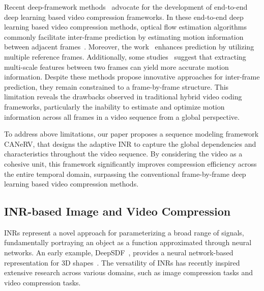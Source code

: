 Recent deep-framework methods~\cite{DBLP:conf/eccv/WuSK18,DBLP:conf/iccv/DjelouahCSS19,DBLP:conf/sips/PessoaATF20,DBLP:conf/dcc/CuiZZJZWZ17,DBLP:journals/tcsv/YanLLLLW19,DBLP:conf/cvpr/LuO0ZCG19,DBLP:conf/cvpr/Lin0L020,DBLP:conf/cvpr/HuL021,li2021deep,ho2022canf,DBLP:journals/tmm/ShengLLLLL23,DBLP:conf/cvpr/LiLL23,Li_2024_CVPR} advocate for the development of end-to-end deep learning based video compression frameworks. In these end-to-end deep learning based video compression methods, optical flow estimation algorithms commonly facilitate inter-frame prediction by estimating motion information between adjacent frames~\cite{DBLP:conf/cvpr/LuO0ZCG19,DBLP:conf/cvpr/HuL021,li2021deep}. Moreover, the work~\cite{DBLP:conf/cvpr/Lin0L020} enhances prediction by utilizing multiple reference frames. Additionally, some studies~\cite{DBLP:journals/tmm/ShengLLLLL23} suggest that extracting multi-scale features between two frames can yield more accurate motion information. Despite these methods propose innovative approaches for inter-frame prediction, they remain constrained to a frame-by-frame structure. This limitation reveals the drawbacks observed in traditional hybrid video coding frameworks, particularly the inability to estimate and optimize motion information across all frames in a video sequence from a global perspective.

To address above limitations, our paper proposes a sequence modeling framework CANeRV, that designs the adaptive INR to capture the global dependencies and characteristics throughout the video sequence. By considering the video as a cohesive unit, this framework significantly improves compression efficiency across the entire temporal domain, surpassing the conventional frame-by-frame deep learning based video compression methods.

\subsection{INR-based Image and Video Compression}
INRs represent a novel approach for parameterizing a broad range of signals, fundamentally portraying an object as a function approximated through neural networks. An early example, DeepSDF~\cite{DBLP:conf/cvpr/ParkFSNL19}, provides a neural network-based representation for 3D shapes~\cite{DBLP:conf/cvpr/MeschederONNG19}. The versatility of INRs has recently inspired extensive research across various domains, such as image compression tasks and video compression tasks.

